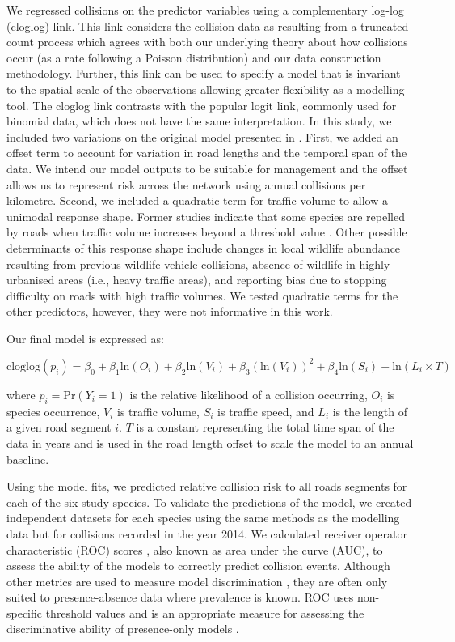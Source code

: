 We regressed collisions on the predictor variables using a complementary log-log (cloglog) link.  This link considers the collision data as resulting from a truncated count process which agrees with both our underlying theory about how collisions occur (as a rate following a Poisson distribution) and our data construction methodology. Further, this link can be used to specify a model that is invariant to the spatial scale of the observations allowing greater flexibility as a modelling tool. The cloglog link contrasts with the popular logit link, commonly used for binomial data, which does not have the same interpretation. In this study, we included two variations on the original model presented in . First, we added an offset term to account for variation in road lengths and the temporal span of the data. We intend our model outputs to be suitable for management and the offset allows us to represent risk across the network using annual collisions per kilometre. Second, we included a quadratic term for traffic volume to allow a unimodal response shape. Former studies indicate that some species are repelled by roads when traffic volume increases beyond a threshold value \citep{seil05,gagn07}. Other possible determinants of this response shape include changes in local wildlife abundance resulting from previous wildlife-vehicle collisions, absence of wildlife in highly urbanised areas (i.e., heavy traffic areas), and reporting bias due to stopping difficulty on roads with high traffic volumes. We tested quadratic terms for the other predictors, however, they were not informative in this work.

Our final model is expressed as: 

\begin{equation}
\text{cloglog}(p_i) = \beta_0 + \beta_1 \text{ln}(O_i) + \beta_2 \text{ln}(V_i) + \beta_3 (\text{ln}(V_i))^2 + \beta_4 \text{ln}(S_i) + \text{ln}(L_i \times T)
\end{equation}

\noindent where $p_i=\text{Pr}(Y_i=1)$ is the relative likelihood of a collision occurring, $O_i$ is species occurrence, $V_i$ is traffic volume, $S_i$ is traffic speed, and $L_i$ is the length of a given road segment $i$. $T$ is a constant representing the total time span of the data in years and is used in the road length offset to scale the model to an annual baseline.

Using the model fits, we predicted relative collision risk to all roads segments for each of the six study species.  To validate the predictions of the model, we created independent datasets for each species using the same methods as the modelling data but for collisions recorded in the year 2014.  We calculated receiver operator characteristic (ROC) scores \citep{metz78}, also known as area under the curve (AUC), to assess the ability of the models to correctly predict collision events. Although other metrics are used to measure model discrimination \citep[e.g. true skill statistic (TSS), see][]{allo06}, they are often only suited to presence-absence data where prevalence is known. ROC uses non-specific threshold values and is an appropriate measure for assessing the discriminative ability of presence-only models \citep{laws14}. 

